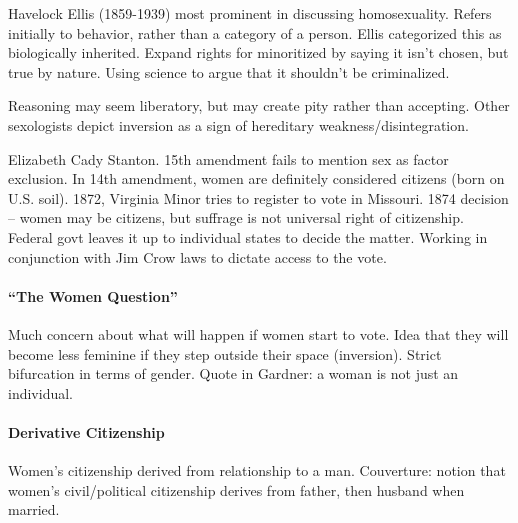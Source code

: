 Havelock Ellis (1859-1939) most prominent in discussing homosexuality. Refers initially to behavior, rather than a category of a person. Ellis categorized this as biologically inherited. Expand rights for minoritized by saying it isn't chosen, but true by nature. Using science to argue that it shouldn't be criminalized.

Reasoning may seem liberatory, but may create pity rather than accepting. Other sexologists depict inversion as a sign of hereditary weakness/disintegration.

Elizabeth Cady Stanton. 15th amendment fails to mention sex as factor exclusion. In 14th amendment, women are definitely considered citizens (born on U.S. soil). 1872, Virginia Minor tries to register to vote in Missouri. 1874 decision -- women may be citizens, but suffrage is not universal right of citizenship. Federal govt leaves it up to individual states to decide the matter. Working in conjunction with Jim Crow laws to dictate access to the vote.

\paragraph{``The Women Question''} Much concern about what will happen if women start to vote. Idea that they will become less feminine if they step outside their space (inversion). Strict bifurcation in terms of gender. Quote in Gardner: a woman is not just an individual.

\paragraph{Derivative Citizenship} Women's citizenship derived from relationship to a man. Couverture: notion that women's civil/political citizenship derives from father, then husband when married.
